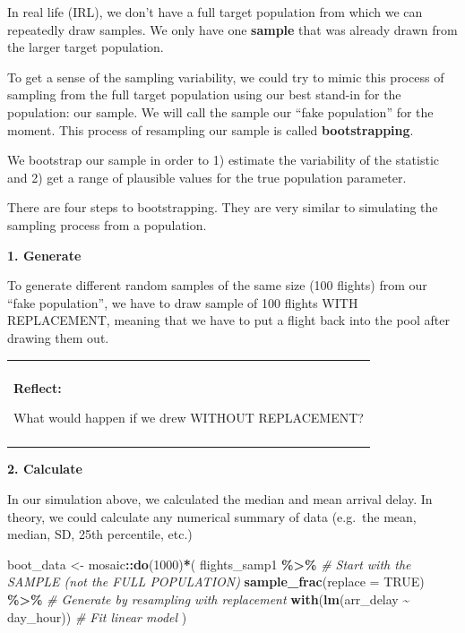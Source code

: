 \documentclass[
]{book}
\newenvironment{Shaded}{\begin{snugshade}}{\end{snugshade}}
\newcommand{\AttributeTok}[1]{\textcolor[rgb]{0.13,0.29,0.53}{#1}}
\newcommand{\CommentTok}[1]{\textcolor[rgb]{0.56,0.35,0.01}{\textit{#1}}}
\newcommand{\ConstantTok}[1]{\textcolor[rgb]{0.56,0.35,0.01}{#1}}
\newcommand{\DecValTok}[1]{\textcolor[rgb]{0.00,0.00,0.81}{#1}}
\newcommand{\FunctionTok}[1]{\textcolor[rgb]{0.13,0.29,0.53}{\textbf{#1}}}
\newcommand{\NormalTok}[1]{#1}
\newcommand{\OtherTok}[1]{\textcolor[rgb]{0.56,0.35,0.01}{#1}}
\newcommand{\SpecialCharTok}[1]{\textcolor[rgb]{0.81,0.36,0.00}{\textbf{#1}}}
\newenvironment{reflect}
{
    \begin{center}
    
    \begin{tabular}{|p{0.8\textwidth}|}
    \rowcolor{LightBlue}
    \hline\\
    \rowcolor{LightBlue}
    \textbf{Reflect:}
}
{
    \\\rowcolor{LightBlue}
    \\\hline
    \end{tabular} 
    \end{center}
}
\begin{document}
In real life (IRL), we don't have a full target population from which we can repeatedly draw samples. We only have one \textbf{sample} that was already drawn from the larger target population.

To get a sense of the sampling variability, we could try to mimic this process of sampling from the full target population using our best stand-in for the population: our sample. We will call the sample our ``fake population'' for the moment. This process of resampling our sample is called \textbf{bootstrapping}.

We bootstrap our sample in order to 1) estimate the variability of the statistic and 2) get a range of plausible values for the true population parameter.

There are four steps to bootstrapping. They are very similar to simulating the sampling process from a population.

\textbf{1. Generate}

To generate different random samples of the same size (100 flights) from our ``fake population'', we have to draw sample of 100 flights WITH REPLACEMENT, meaning that we have to put a flight back into the pool after drawing them out.

\begin{reflect}
What would happen if we drew WITHOUT REPLACEMENT?
\end{reflect}

\textbf{2. Calculate}

In our simulation above, we calculated the median and mean arrival delay. In theory, we could calculate any numerical summary of data (e.g.~the mean, median, SD, 25th percentile, etc.)

\begin{Shaded}
\begin{Highlighting}[]
\NormalTok{boot\_data }\OtherTok{\textless{}{-}}\NormalTok{ mosaic}\SpecialCharTok{::}\FunctionTok{do}\NormalTok{(}\DecValTok{1000}\NormalTok{)}\SpecialCharTok{*}\NormalTok{( }
\NormalTok{    flights\_samp1 }\SpecialCharTok{\%\textgreater{}\%} \CommentTok{\# Start with the SAMPLE (not the FULL POPULATION)}
      \FunctionTok{sample\_frac}\NormalTok{(}\AttributeTok{replace =} \ConstantTok{TRUE}\NormalTok{) }\SpecialCharTok{\%\textgreater{}\%} \CommentTok{\# Generate by resampling with replacement}
      \FunctionTok{with}\NormalTok{(}\FunctionTok{lm}\NormalTok{(arr\_delay }\SpecialCharTok{\textasciitilde{}}\NormalTok{ day\_hour)) }\CommentTok{\# Fit linear model}
\NormalTok{)}
\end{Highlighting}
\end{Shaded}
\end{document}
